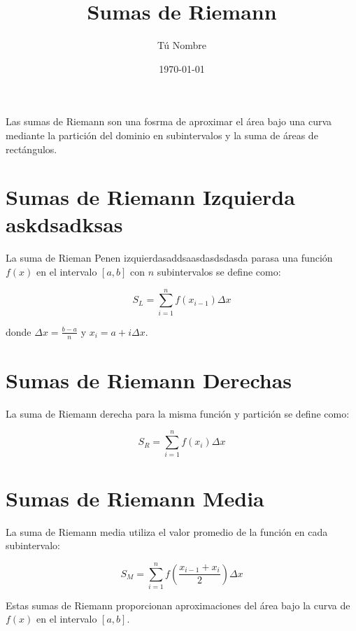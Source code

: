 \documentclass{article}
\begin{document}
\title{Sumas de Riemann}
\author{Tú Nombre}
\date{\today}
\maketitle

Las sumas de Riemann son una fosrma de aproximar el área bajo una curva mediante la partición del dominio en subintervalos y la suma de áreas de rectángulos.

\section{Sumas de Riemann Izquierda askdsadksas}

La suma de Rieman Penen izquierdasaddsaasdasdsdasda parasa una función $f(x)$ en el intervalo $[a, b]$ con $n$ subintervalos se define como:

\[
S_L = \sum_{i=1}^{n} f(x_{i-1}) \Delta x
\]

donde $\Delta x = \frac{b-a}{n}$ y $x_i = a + i \Delta x$.

\section{Sumas de Riemann Derechas}

La suma de Riemann derecha para la misma función y partición se define como:

\[
S_R = \sum_{i=1}^{n} f(x_i) \Delta x
\]

\section{Sumas de Riemann Media}

La suma de Riemann media utiliza el valor promedio de la función en cada subintervalo:

\[
S_M = \sum_{i=1}^{n} f\left(\frac{x_{i-1}+x_i}{2}\right) \Delta x
\]

Estas sumas de Riemann proporcionan aproximaciones del área bajo la curva de $f(x)$ en el intervalo $[a, b]$.
\end{document}
